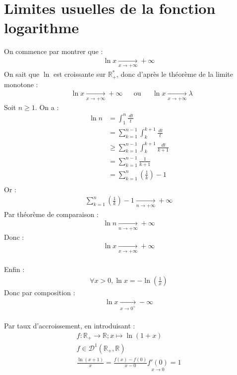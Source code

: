 \documentclass[../main.tex]{subfiles}
\begin{document}
\section{Limites usuelles de la fonction logarithme}
On commence par montrer que : 
\begin{align*}
    \ln x \underset{x \rightarrow +\infty}{\longrightarrow} +\infty
\end{align*}
On sait que $\ln$ est croissante sur $\mathbb{R}_+^*$, donc d'après le théorème de la limite monotone : 
\begin{align*}
    & \ln x \underset{x \rightarrow +\infty}{\longrightarrow} +\infty && \text{ou} && \ln x \underset{x \rightarrow +\infty}{\longrightarrow} \lambda
\end{align*}
Soit $n \geq 1$. On a :
\begin{align*}
    \ln n  &= \int_{1}^{n} \frac{\,dt}{t} \\
    &= \sum_{k = 1}^{n - 1} \int_{k}^{k + 1} \frac{\,dt}{t} \\
    &\geq \sum_{k = 1}^{n - 1} \int_{k}^{k + 1} \frac{\,dt}{k + 1} \\
    &= \sum_{k = 1}^{n - 1} \frac{1}{k + 1} \\
    &= \sum_{k = 1}^{n} \left( \frac{1}{k} \right) - 1 \\
\end{align*}
Or :
\begin{align*}
    \sum_{k=1}^{n} \left( \frac{1}{k} \right) - 1 \underset{n \rightarrow +\infty}{\longrightarrow} +\infty
\end{align*}
Par théorème de comparaison : 
\begin{align*}
    \ln n \underset{n \rightarrow +\infty}{\longrightarrow} +\infty
\end{align*}
Donc : 
\begin{align*}
    \ln x \underset{x \rightarrow +\infty}{\longrightarrow} +\infty
\end{align*} \\
Enfin : 
\begin{align*}
    \forall x > 0, \ln x = -\ln \left( \frac{1}{x} \right)
\end{align*}
Donc par composition :
\begin{align*}
    \ln x \underset{x \rightarrow 0^+}{\longrightarrow} -\infty
\end{align*} \\
Par taux d'accroissement, en introduisant : 
\begin{align*}
    f: \mathbb{R}_+ \rightarrow \mathbb{R} ; x \mapsto \ln (1 + x) \\
    f \in \mathcal{D}^1(\mathbb{R}_+, \mathbb{R}) \\
    \frac{\ln (x + 1)}{x} = \frac{f(x) - f(0)}{x - 0} \underset{x \rightarrow 0}{f'(0)} = 1
\end{align*}
\end{document}
